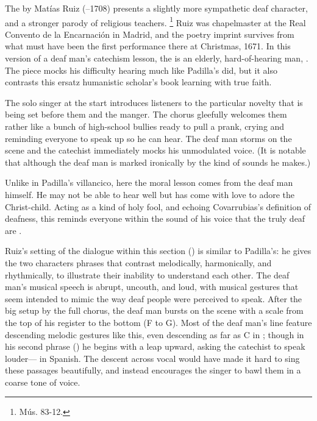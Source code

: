 The  by Matías Ruiz (--1708) presents a slightly more sympathetic deaf character, and a stronger parody of religious teachers.%
  \footnote{\signature{E-E}{Mús. 83-12}.}
Ruiz was chapelmaster at the Real Convento de la Encarnación in Madrid, and the poetry imprint survives from what must have been the first performance there at Christmas, 1671.%
  \autocite{1671-Madrid-Enc-Nav}
In this version of a deaf man's catechism lesson, the  is an elderly, hard-of-hearing man, .
The piece mocks his difficulty hearing much like Padilla's did, but it also contrasts this ersatz humanistic scholar's book learning with true faith.

The solo singer at the start introduces listeners to the particular novelty that is being set before them and the manger.
The chorus gleefully welcomes them rather like a bunch of high-school bullies ready to pull a prank, crying  and reminding everyone to speak up so he can hear.
The deaf man storms on the scene and the catechist immediately mocks his unmodulated voice.
(It is notable that although the deaf man is marked ironically by the kind of sounds he makes.)

Unlike in Padilla's villancico, here the moral lesson comes from the deaf man himself.
He may not be able to hear well but has come with love to adore the Christ-child. 
Acting as a kind of holy fool, and echoing Covarrubias's definition of deafness, this  reminds everyone within the sound of his voice that the truly deaf are .


Ruiz's setting of the dialogue within this section () is similar to Padilla's: he gives the two characters phrases that contrast melodically, harmonically, and rhythmically, to illustrate their inability to understand each other.
The deaf man's musical speech is abrupt, uncouth, and loud, with musical gestures that seem intended to mimic the way deaf people were perceived to speak.
After the big setup by the full chorus, the deaf man bursts on the scene with a scale from the top of his register to the bottom (F to G).
Most of the deaf man's line feature descending melodic gestures like this, even descending as far as C in ; though in his second phrase () he begins with a leap upward, asking the catechist to speak louder--- in Spanish.
The descent across vocal  would have made it hard to sing these passages beautifully, and instead encourages the singer to bawl them in a coarse tone of voice.

